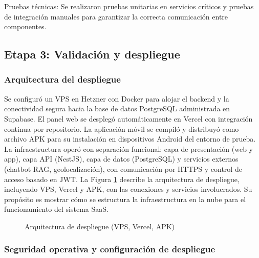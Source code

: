   Pruebas técnicas: Se realizaron pruebas unitarias en servicios críticos y pruebas de integración manuales para garantizar la correcta comunicación entre componentes.

  \subsection{Etapa 3: Validación y despliegue}

  \subsubsection{Arquitectura del despliegue}

  Se configuró un VPS en Hetzner con Docker para alojar el backend y la conectividad segura hacia la base de datos PostgreSQL administrada en Supabase. El panel web se desplegó automáticamente en Vercel con integración continua por repositorio. La aplicación móvil se compiló y distribuyó como archivo APK para su instalación en dispositivos Android del entorno de prueba.
  La infraestructura operó con separación funcional: capa de presentación (web y app), capa API (NestJS), capa de datos (PostgreSQL) y servicios externos (chatbot RAG, geolocalización), con comunicación por HTTPS y control de acceso basado en JWT.
  La Figura \ref{fig:despliegue-arquitectura} describe la arquitectura de despliegue, incluyendo VPS, Vercel y APK, con las conexiones y servicios involucrados. Su propósito es mostrar cómo se estructura la infraestructura en la nube para el funcionamiento del sistema SaaS.

  \begin{figure}[htbp]
  \centering
  \resizebox{0.9\textwidth}{!}{}
  \caption[Arquitectura de despliegue]{Arquitectura de despliegue (VPS, Vercel, APK)}
  \label{fig:despliegue-arquitectura}
  \end{figure}

  \subsubsection{Seguridad operativa y configuración de despliegue}

